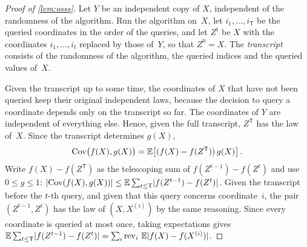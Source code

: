 \begin{proof}[Proof of \cref{lem:osss}]
Let $Y$ be an independent copy of $X$, independent of the randomness of the algorithm. Run the
algorithm on~$X$, let $i_1,\dots,i_{\mathsf T}$ be the queried coordinates in the order of the queries,
and let $Z^t$ be $X$ with the coordinates $i_1,\dots,i_t$ replaced by those of~$Y$, so that $Z^0=X$.
The \emph{transcript} consists of the randomness of the algorithm, the queried indices and the queried
values of~$X$.

Given the transcript up to some time, the coordinates of $X$ that have not been queried keep their
original independent laws, because the decision to query a coordinate depends only on the transcript so
far. The coordinates of $Y$ are independent of everything else. Hence, given the full transcript, $Z^{\mathsf T}$
has the law of~$X$. Since the transcript determines $g(X)$,
\begin{equation*}
  \operatorname{Cov}\bigl(f(X),g(X)\bigr)=\mathbb E\bigl[(f(X)-f(Z^{\mathsf T}))\,g(X)\bigr]\,.
\end{equation*}
Write $f(X)-f(Z^{\mathsf T})$ as the telescoping sum of $f(Z^{t-1})-f(Z^t)$ and use $0\le g\le1$:
$\lvert\operatorname{Cov}(f(X),g(X))\rvert\le\mathbb E\sum_{t\le\mathsf T}\lvert f(Z^{t-1})-f(Z^t)\rvert$. Given the transcript before the
$t$-th query, and given that this query concerns coordinate~$i$, the pair $(Z^{t-1},Z^t)$ has the law of
$(X,X^{(i)})$ by the same reasoning. Since every coordinate is queried at most once, taking expectations
gives $\mathbb E\sum_{t\le\mathsf T}\lvert f(Z^{t-1})-f(Z^t)\rvert=\sum_i\operatorname{rev}_i\,\mathbb E\lvert f(X)-f(X^{(i)})\rvert$.
\end{proof}
